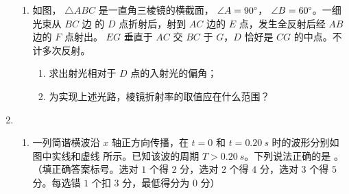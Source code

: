 \begin{enumerate}
\begin{enumerate}
\item 
如图， $ \triangle ABC $ 是一直角三棱镜的横截面，  $ \angle A=90 \degree $，  $ \angle B=60 \degree $。一细光束从 $ BC $ 边
的 $ D $ 点折射后，射到 $ AC $ 边的 $ E $ 点，发生全反射后经 $ AB $ 边的 $ F $ 点射出。 $ EG $ 垂直于 $ AC $ 交 $ BC $ 于
$ G $，$ D $ 恰好是 $ CG $ 的中点。不计多次反射。
\begin{enumerate}
	\item
求出射光相对于 $ D $ 点的入射光的偏角；
\item 
为实现上述光路，棱镜折射率的取值应在什么范围？
\end{enumerate}
\begin{figure}[h!]
	\flushright
	
\end{figure}



\end{enumerate}

\item 
{}
 \begin{enumerate}
 	\item
一列简谐横波沿 $ x $ 轴正方向传播，在 $ t=0 $ 和 $ t=0.20 \ s $ 时的波形分别如图中实线和虚线
所示。已知该波的周期 $ T>0.20 \ s $。下列说法正确的是  \underlinegap 。（填正确答案标号。选对 $ 1 $ 个得 $ 2 $
分，选对 $ 2 $ 个得 $ 4 $ 分，选对 $ 3 $ 个得 $ 5 $ 分。每选错 $ 1 $ 个扣 $ 3 $ 分，最低得分为 $ 0 $ 分）
\begin{figure}[h!]
	\centering
	
\end{figure}


\end{enumerate}
\end{enumerate}
